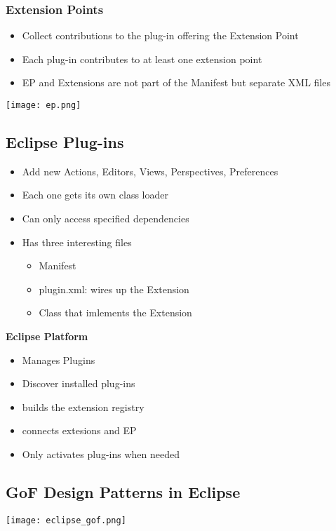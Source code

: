 \subsubsection{Extension Points}
\begin{itemize}
    \item Collect contributions to the plug-in offering the Extension Point
    \item Each plug-in contributes to at least one extension point
    \item EP and Extensions are not part of the Manifest but separate XML files
\end{itemize}
\texttt{[image: ep.png]}

\subsection{Eclipse Plug-ins}
\begin{itemize}
    \item Add new Actions, Editors, Views, Perspectives, Preferences
    \item Each one gets its own class loader
    \item Can only access specified dependencies
    \item Has three interesting files
    \begin{itemize}
        \item Manifest
        \item plugin.xml: wires up the Extension
        \item Class that imlements the Extension
    \end{itemize}
\end{itemize}
\textbf{Eclipse Platform}
\begin{itemize}
    \item Manages Plugins
    \item Discover installed plug-ins
    \item builds the extension registry
    \item connects extesions and EP
    \item Only activates plug-ins when needed
\end{itemize}

\subsection{GoF Design Patterns in Eclipse}
\texttt{[image: eclipse\_gof.png]}

